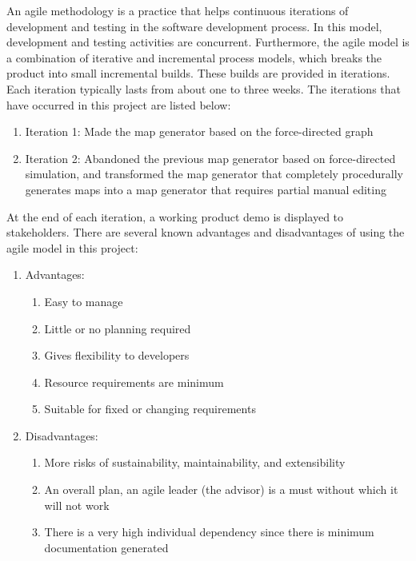 An agile methodology is a practice that helps continuous iterations of development and testing in the software development process. In this model, development and testing activities are concurrent. Furthermore, the agile model is a combination of iterative and incremental process models, which breaks the product into small incremental builds. These builds are provided in iterations. Each iteration typically lasts from about one to three weeks.
The iterations that have occurred in this project are listed below:
\begin{enumerate}
  \item Iteration 1: Made the map generator based on the force-directed graph
  \item Iteration 2: Abandoned the previous map generator based on force-directed simulation, and transformed the map generator that completely procedurally generates maps into a map generator that requires partial manual editing
\end{enumerate}
At the end of each iteration, a working product demo is displayed to stakeholders. There are several known advantages and disadvantages of using the agile model in this project:
\begin{enumerate}

  \item Advantages:
  \begin{enumerate}
    \item Easy to manage
    \item Little or no planning required
    \item Gives flexibility to developers
    \item Resource requirements are minimum
    \item Suitable for fixed or changing requirements
  \end{enumerate}

  \item Disadvantages:
  \begin{enumerate}
    \item More risks of sustainability, maintainability, and extensibility
    \item An overall plan, an agile leader (the advisor) is a must without which it will not work
    \item There is a very high individual dependency since there is minimum documentation generated
  \end{enumerate}

\end{enumerate}
